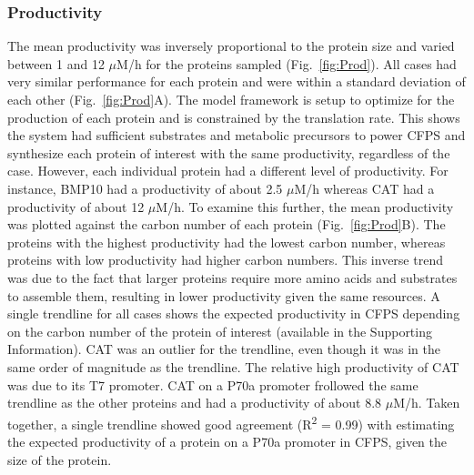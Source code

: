 \documentclass[journal=asbcd6,manuscript=article]{achemso}
\begin{document}
\subsubsection{Productivity}
The mean productivity was inversely proportional to the protein size and varied between 1 and 12 $\mu$M/h for the proteins sampled (Fig.~\ref{fig:Prod}).
All cases had very similar performance for each protein and were within a standard deviation of each other (Fig.~\ref{fig:Prod}A).
The model framework is setup to optimize for the production of each protein and is constrained by the translation rate.
This shows the system had sufficient substrates and metabolic precursors to power CFPS and synthesize each protein of interest with the same productivity, regardless of the case.
However, each individual protein had a different level of productivity.
For instance, BMP10 had a productivity of about 2.5 $\mu$M/h whereas CAT had a productivity of about 12 $\mu$M/h.
To examine this further, the mean productivity was plotted against the carbon number of each protein (Fig.~\ref{fig:Prod}B).
The proteins with the highest productivity had the lowest carbon number, whereas proteins with low productivity had higher carbon numbers.
This inverse trend was due to the fact that larger proteins require more amino acids and substrates to assemble them, resulting in lower productivity given the same resources.
A single trendline for all cases shows the expected productivity in CFPS depending on the carbon number of the protein of interest (available in the Supporting Information).
CAT was an outlier for the trendline, even though it was in the same order of magnitude as the trendline.
The relative high productivity of CAT was due to its T7 promoter.
CAT on a P70a promoter frollowed the same trendline as the other proteins and had a productivity of about 8.8 $\mu$M/h. 
Taken together, a single trendline showed good agreement (R\textsuperscript{2} = 0.99) with estimating the expected productivity of a protein on a P70a promoter in CFPS, given the size of the protein.
\end{document}
